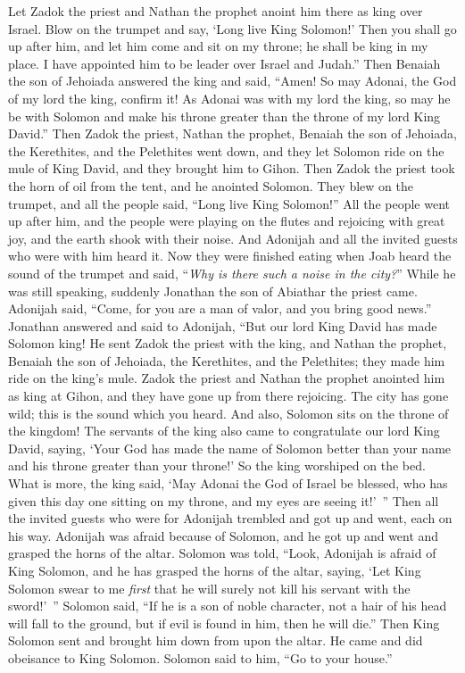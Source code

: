 \begin{biblechapter}
\verse Let Zadok the priest and Nathan the prophet anoint him there as king over Israel. Blow on the trumpet and say, ‘Long live King Solomon!’
\verse Then you shall go up after him, and let him come and sit on my throne; he shall be king in my place. I have appointed him to be leader over Israel and Judah.”
\verse Then Benaiah the son of Jehoiada answered the king and said, “Amen! So may Adonai, the God of my lord the king, confirm it!
\verse As Adonai was with my lord the king, so may he be with Solomon and make his throne greater than the throne of my lord King David.”
\verse Then Zadok the priest, Nathan the prophet, Benaiah the son of Jehoiada, the Kerethites, and the Pelethites went down, and they let Solomon ride on the mule of King David, and they brought him to Gihon.
\verse Then Zadok the priest took the horn of oil from the tent, and he anointed Solomon. They blew on the trumpet, and all the people said, “Long live King Solomon!”
\verse All the people went up after him, and the people were playing on the flutes and rejoicing with great joy, and the earth shook with their noise.
 And Adonijah and all the invited guests who were with him heard it. Now they were finished eating when Joab heard the sound of the trumpet and said, “\textit{Why is there such a noise in the city?}”
\verse While he was still speaking, suddenly Jonathan the son of Abiathar the priest came. Adonijah said, “Come, for you are a man of valor, and you bring good news.”
\verse Jonathan answered and said to Adonijah, “But our lord King David has made Solomon king!
\verse He sent Zadok the priest with the king, and Nathan the prophet, Benaiah the son of Jehoiada, the Kerethites, and the Pelethites; they made him ride on the king’s mule.
\verse Zadok the priest and Nathan the prophet anointed him as king at Gihon, and they have gone up from there rejoicing. The city has gone wild; this is the sound which you heard.
\verse And also, Solomon sits on the throne of the kingdom!
\verse The servants of the king also came to congratulate our lord King David, saying, ‘Your God has made the name of Solomon better than your name and his throne greater than your throne!’ So the king worshiped on the bed.
\verse What is more, the king said, ‘May Adonai the God of Israel be blessed, who has given this day one sitting on my throne, and my eyes are seeing it!’ ”
\verse Then all the invited guests who were for Adonijah trembled and got up and went, each on his way.
\verse Adonijah was afraid because of Solomon, and he got up and went and grasped the horns of the altar.
\verse Solomon was told, “Look, Adonijah is afraid of King Solomon, and he has grasped the horns of the altar, saying, ‘Let King Solomon swear to me \textit{first} that he will surely not kill his servant with the sword!’ ”
\verse Solomon said, “If he is a son of noble character, not a hair of his head will fall to the ground, but if evil is found in him, then he will die.”
\verse Then King Solomon sent and brought him down from upon the altar. He came and did obeisance to King Solomon. Solomon said to him, “Go to your house.”
\end{biblechapter}

